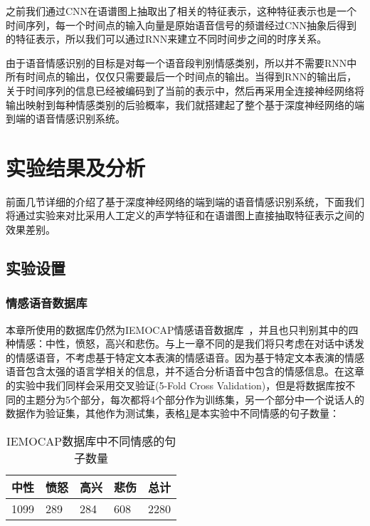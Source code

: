 之前我们通过CNN在语谱图上抽取出了相关的特征表示，这种特征表示也是一个时间序列，每一个时间点的输入向量是原始语音信号的频谱经过CNN抽象后得到的特征表示，所以我们可以通过RNN来建立不同时间步之间的时序关系。

由于语音情感识别的目标是对每一个语音段判别情感类别，所以并不需要RNN中所有时间点的输出，仅仅只需要最后一个时间点的输出。当得到RNN的输出后，关于时间序列的信息已经被编码到了当前的表示中，然后再采用全连接神经网络将输出映射到每种情感类别的后验概率，我们就搭建起了整个基于深度神经网络的端到端的语音情感识别系统。


\section{实验结果及分析}
\label{sec:end2end_experiment}

前面几节详细的介绍了基于深度神经网络的端到端的语音情感识别系统，下面我们将通过实验来对比采用人工定义的声学特征和在语谱图上直接抽取特征表示之间的效果差别。

\subsection{实验设置}
\label{ssec:end2end_experiment_setup}

\subsubsection{情感语音数据库}
\label{ssec:end2end_database}

本章所使用的数据库仍然为IEMOCAP情感语音数据库~\cite{Busso2008IEMOCAP}，并且也只判别其中的四种情感：中性，愤怒，高兴和悲伤。与上一章不同的是我们将只考虑在对话中诱发的情感语音，不考虑基于特定文本表演的情感语音。因为基于特定文本表演的情感语音包含太强的语言学相关的信息，并不适合分析语音中包含的情感信息。在这章的实验中我们同样会采用交叉验证(5-Fold Cross Validation)，但是将数据库按不同的主题分为5个部分，每次都将4个部分作为训练集，另一个部分中一个说话人的数据作为验证集，其他作为测试集，表格\ref{tab:end2end_emo_sample_num}是本实验中不同情感的句子数量：

\begin{table}[htb]
\centering
\begin{minipage}[t]{0.8\linewidth} %
\caption{IEMOCAP数据库中不同情感的句子数量}
\label{tab:end2end_emo_sample_num}
    \begin{tabularx}{\linewidth}{X<{\centering} X<{\centering} X<{\centering} X<{\centering} X<{\centering}}
        \toprule[1.5pt]
        中性 & 愤怒 & 高兴 & 悲伤 & 总计 \\
        \midrule[1pt]
        1099 & 289 & 284 & 608 & 2280 \\
        \bottomrule[1.5pt]
    \end{tabularx}
\end{minipage}
\end{table}

